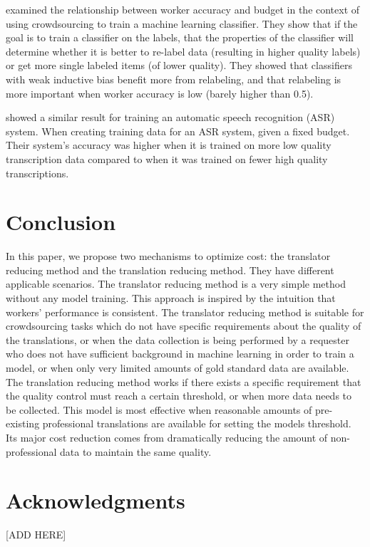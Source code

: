 \documentclass[11pt,letterpaper]{article}
\begin{document}
 examined the relationship between worker accuracy and budget in the context of using crowdsourcing to train a machine learning classifier.  They show that if the goal is to train a classifier on the labels, that the properties of the classifier will determine whether it is better to re-label data (resulting in higher quality labels) or get more single labeled items (of lower quality). They showed that classifiers with weak inductive bias  benefit more from relabeling, and that relabeling is more important when worker accuracy is low (barely higher than 0.5). 

 showed a similar result for training an automatic speech recognition (ASR) system.  When creating training data for an ASR system, given a fixed budget. Their system's accuracy was higher when it is trained on more low quality transcription data compared to when it was trained on fewer high quality transcriptions.


\section{Conclusion}
In this paper, we propose two mechanisms to optimize cost: the translator reducing method and the translation reducing method. They have  different applicable scenarios. The translator reducing method is a very simple method without any model training. This approach is inspired by the intuition that workers' performance is consistent. The translator reducing method is suitable for crowdsourcing tasks which do not have specific requirements about the quality of the translations, or when the data collection is being performed by a requester who does not have sufficient background in machine learning in order to train a model, or when only very limited amounts of gold standard data are available.
The translation reducing method works if there exists a specific requirement that the quality control must reach a certain threshold, or when more data needs to be collected.  This model is most effective when reasonable amounts of pre-existing professional translations are available for setting the models threshold.  Its major cost reduction comes from dramatically reducing the amount of non-professional data to maintain the same quality.

\section*{Acknowledgments}

[ADD HERE]



\end{document}

